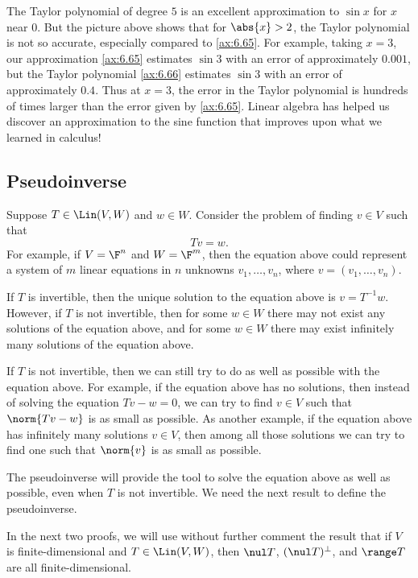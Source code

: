 \begin{example}
The Taylor polynomial of degree $5$ is an excellent approximation to $\sin x$
for $x$ near $0$. But the picture above shows that for $\abs{x}>2$, the Taylor
polynomial is not so accurate, especially compared to \ref{ax:6.65}. For
example, taking $x=3$, our approximation \ref{ax:6.65} estimates $\sin 3$ with
an error of approximately $0.001$, but the Taylor polynomial \ref{ax:6.66}
estimates $\sin 3$ with an error of approximately $0.4$. Thus at $x=3$, the
error in the Taylor polynomial is hundreds of times larger than the error given
by \ref{ax:6.65}. Linear algebra has helped us discover an approximation to the
sine function that improves upon what we learned in calculus!
\end{example}

\subsection{Pseudoinverse}

Suppose $T\in\Lin(V,W)$ and $w\in W$. Consider the problem of finding $v\in V$
such that
\[ Tv = w. \]
For example, if $V=\F^n$ and $W=\F^m$, then the equation above could represent
a system of $m$ linear equations in $n$ unknowns $v_1,\dots,v_n$, where
$v=(v_1,\dots,v_n)$.

If $T$ is invertible, then the unique solution to the equation above is
$v=T^{-1}w$. However, if $T$ is not invertible, then for some $w\in W$ there
may not exist any solutions of the equation above, and for some $w\in W$ there
may exist infinitely many solutions of the equation above.

If $T$ is not invertible, then we can still try to do as well as possible with
the equation above. For example, if the equation above has no solutions, then
instead of solving the equation $Tv-w=0$, we can try to find $v\in V$ such that
$\norm{Tv-w}$ is as small as possible. As another example, if the equation
above has infinitely many solutions $v\in V$, then among all those solutions we
can try to find one such that $\norm{v}$ is as small as possible.

The pseudoinverse will provide the tool to solve the equation above as well as
possible, even when $T$ is not invertible. We need the next result to define
the pseudoinverse.

In the next two proofs, we will use without further comment the result that if
$V$ is finite-dimensional and $T\in\Lin(V,W)$, then $\nul T$,
$(\nul T)^\perp$, and $\range T$ are all finite-dimensional.

